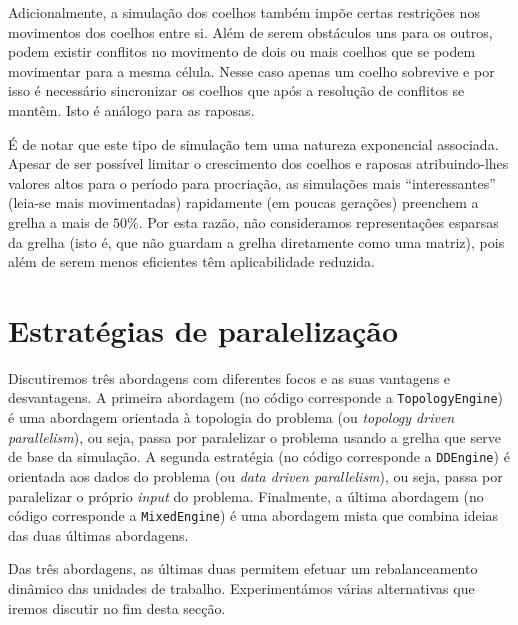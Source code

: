 \documentclass[10pt,a4paper,oneside]{article}
\begin{document}
Adicionalmente, a simulação dos coelhos também impõe certas restrições
nos movimentos dos coelhos entre si. Além de serem obstáculos uns para
os outros, podem existir conflitos no movimento de dois ou mais
coelhos que se podem movimentar para a mesma célula. Nesse caso apenas
um coelho sobrevive e por isso é necessário sincronizar os coelhos que
após a resolução de conflitos se mantêm. Isto é análogo para as
raposas.

É de notar que este tipo de simulação tem uma natureza exponencial
associada. Apesar de ser possível limitar o crescimento dos coelhos e
raposas atribuindo-lhes valores altos para o período para procriação,
as simulações mais ``interessantes'' (leia-se mais movimentadas)
rapidamente (em poucas gerações) preenchem a grelha a mais de
$50\%$. Por esta razão, não consideramos representações esparsas da
grelha (isto é, que não guardam a grelha diretamente como uma matriz),
pois além de serem menos eficientes têm aplicabilidade reduzida.


\section{Estratégias de paralelização}
\label{sec:par}
Discutiremos três abordagens com diferentes focos e as suas vantagens
e desvantagens. A primeira abordagem (no código corresponde a
\texttt{TopologyEngine}) é uma abordagem orientada à topologia do
problema (ou \textit{topology driven parallelism}), ou seja, passa por
paralelizar o problema usando a grelha que serve de base da
simulação. A segunda estratégia (no código corresponde a
\texttt{DDEngine}) é orientada aos dados do problema (ou \textit{data
  driven parallelism}), ou seja, passa por paralelizar o próprio
\textit{input} do problema. Finalmente, a última abordagem (no código
corresponde a \texttt{MixedEngine}) é uma abordagem mista que combina
ideias das duas últimas abordagens.

Das três abordagens, as últimas duas permitem efetuar um
rebalanceamento dinâmico das unidades de trabalho. Experimentámos
várias alternativas que iremos discutir no fim desta secção.
\end{document}
